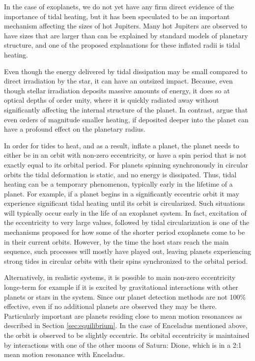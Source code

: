 In the case of exoplanets, we do not yet have any firm direct evidence of the
importance of tidal heating, but it has been speculated to be an important
mechanism affecting the sizes of hot Jupiters. Many hot Jupiters are observed to
have sizes that are larger than can be explained by standard models of planetary
structure, and one of the proposed explanations for these inflated radii is
tidal heating.

Even though the energy delivered by tidal dissipation may be small compared to
direct irradiation by the star, it can have an outsized impact. Because, even
though stellar irradiation deposits massive amounts of energy, it does so at
optical depths of order unity, where it is quickly radiated away without
significantly affecting the internal structure of the planet. In contrast,
\citet{Komacek_Youdin_17} argue that even orders of magnitude smaller heating,
if deposited deeper into the planet can have a profound effect on the planetary
radius.

In order for tides to heat, and as a result, inflate a planet, the planet needs
to either be in an orbit with non-zero eccentricity, or have a spin period that
is not exactly equal to its orbital period. For planets spinning synchronously
in circular orbits the tidal deformation is static, and no energy is dissipated.
Thus, tidal heating can be a temporary phenomenon, typically early in the
lifetime of a planet. For example, if a planet begins in a significantly
eccentric orbit it  may experience significant tidal heating until its orbit is
circularized. Such situations will typically occur early in the life of an
exoplanet system. In fact, excitation of the eccentricity to very large values,
followed by tidal circularization is one of the mechanisms proposed for how some
of the shorter period exoplanets come to be in their current orbits. However, by
the time the host stars reach the main sequence, such processes will mostly have
played out, leaving planets experiencing strong tides in circular orbits with
their spins synchronized to the orbital period.

Alternatively, in realistic systems, it is possible to main non-zero
eccentricity longe-term for example if it is excited by gravitational
interactions with other planets or stars in the system. Since our planet
detection methods are not 100\% effective, even if no additional planets are
observed they may be there.  Particularly important are planets residing close
to mean motion resonances as described in Section \ref{sec:equilibrium}. In the
case of Enceladus mentioned above, the orbit is observed to be slightly
eccentric. Its orbital eccentricity is maintained by interactions with one of
the other moons of Saturn: Dione, which is in a 2:1 mean motion resonance with
Enceladus.

